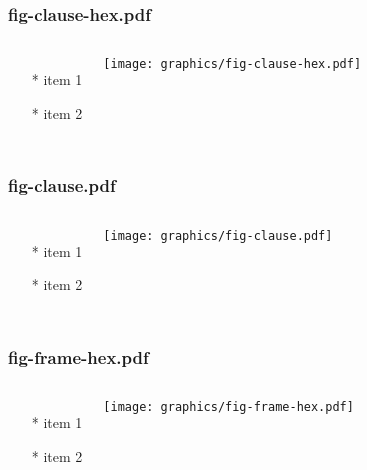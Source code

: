 \documentclass{beamer}
\begin{document}
\begin{frame} \frametitle{fig-clause-hex.pdf}
    \begin{columns}[c]
        \begin{itemize}
            \item[*] item 1
            \item[*] item 2
        \end{itemize}
        \begin{minipage}{\linewidth}
            \begin{center}
            \texttt{[image: graphics/fig-clause-hex.pdf]}
            \label{gfx:fig-clause-hex.pdf}
            \end{center}
        \end{minipage}
    \end{columns}
\end{frame}
\begin{frame} \frametitle{fig-clause.pdf}
    \begin{columns}[c]
        \begin{itemize}
            \item[*] item 1
            \item[*] item 2
        \end{itemize}
        \begin{minipage}{\linewidth}
            \begin{center}
            \texttt{[image: graphics/fig-clause.pdf]}
            \label{gfx:fig-clause.pdf}
            \end{center}
        \end{minipage}
    \end{columns}
\end{frame}
\begin{frame} \frametitle{fig-frame-hex.pdf}
    \begin{columns}[c]
        \begin{itemize}
            \item[*] item 1
            \item[*] item 2
        \end{itemize}
        \begin{minipage}{\linewidth}
            \begin{center}
            \texttt{[image: graphics/fig-frame-hex.pdf]}
            \label{gfx:fig-frame-hex.pdf}
            \end{center}
        \end{minipage}
    \end{columns}
\end{frame}
\end{document}
